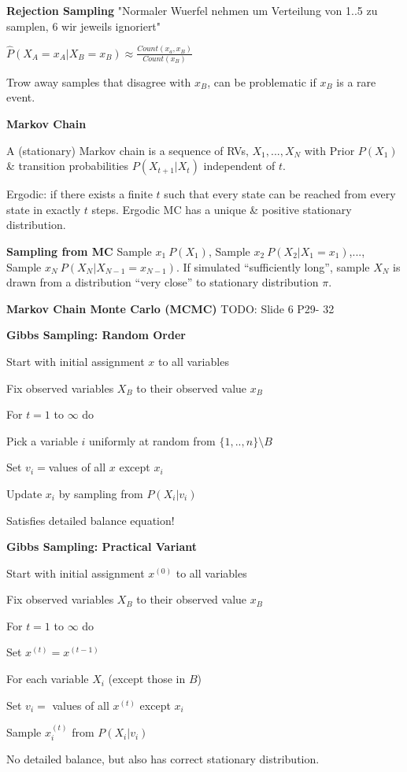 \documentclass[a4paper, 11pt, landscape]{article}
\begin{document}
\begin{multicols*}{3}
\textbf{Rejection Sampling}
"Normaler Wuerfel nehmen um Verteilung von 1..5 zu samplen, 6 wir jeweils ignoriert"

$\hat{P}(X_A = x_A | X_B = x_B) \approx \frac{Count(x_a, x_B)}{Count(x_B)}$

Trow away samples that disagree with $x_B$, can be problematic if $x_B$ is a rare event. 

\textbf{Markov Chain}

A (stationary) Markov chain is a sequence of RVs, $X_1,...,X_N$ with Prior $P(X_1)$ \& transition probabilities $P(X_{t+1} | X_t)$ independent of $t$.


Ergodic: if there exists a finite $t$ such that every state can be reached from every state in exactly $t$ steps. Ergodic MC has a unique \& positive stationary distribution.

\textbf{Sampling from MC}
Sample $x_1~P(X_1)$, Sample $x_2~P(X_2 | X_1=x_1)$,..., Sample $x_N~P(X_N | X_{N-1}=x_{N-1})$.
If simulated “sufficiently long”, sample $X_N$ is drawn from a distribution “very close” to stationary distribution $\pi$.

\textbf{Markov Chain Monte Carlo (MCMC)}
TODO: Slide 6 P29- 32

\textbf{Gibbs Sampling: Random Order}
\begin{compactitem}
\item Start with initial assignment $x$ to all variables
\item Fix observed variables $X_B$ to their observed value $x_B$
\item For $t=1$ to $\infty$ do
\begin{compactenum}
\item Pick a variable $i$ uniformly at random from $\{1,..,n\} \setminus B$
\item Set $v_i = $values of all $x$ except $x_i$
\item Update $x_i$ by sampling from $P(X_i | v_i)$
\end{compactenum}
\end{compactitem}
Satisfies detailed balance equation!

\textbf{Gibbs Sampling: Practical Variant}
\begin{compactitem}
 \item Start with initial assignment $x^{(0)}$ to all variables
 \item Fix observed variables $X_B$ to their observed value $x_B$
 \item For $t=1$ to $\infty$ do 
\begin{compactenum}
\item Set $x^{(t)} = x^{(t-1)}$
\item For each variable $X_i$ (except those in $B$) 
\item Set $v_i =$ values of all $x^{(t)}$ except $x_i$
\item Sample $x_i^{(t)}$ from $P(X_i | v_i)$
\end{compactenum}
\end{compactitem}
No detailed balance, but also has correct stationary distribution.


\end{multicols*}
\end{document}
